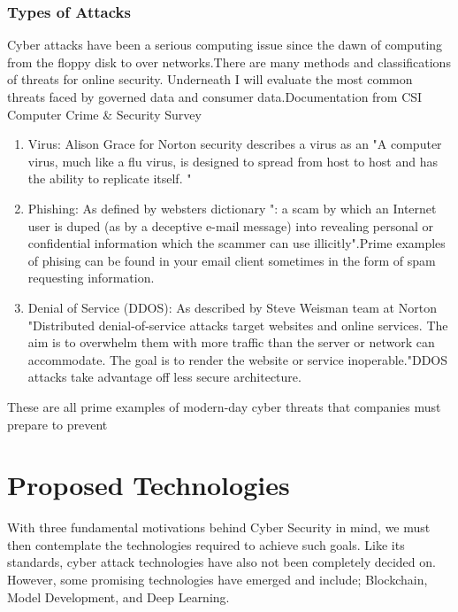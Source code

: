 \documentclass[journal]{IEEEtran}
\begin{document}
\subsubsection{Types of Attacks }
Cyber attacks have been a serious computing issue since the dawn of computing from the floppy disk to over networks.There are many methods and classifications of threats for online security. Underneath I will evaluate the most common threats faced by governed data and consumer data.Documentation from CSI Computer Crime & Security Survey \cite{csiSurvey}


\begin{enumerate}
  \item     Virus: Alison Grace for Norton security \cite{nortonVirus}  describes a virus as an "A computer virus, much like a flu virus, is designed to spread from host to host and has the ability to replicate itself. "
    \item    Phishing: As defined by websters dictionary ": a scam by which an Internet user is duped (as by a deceptive e-mail message) into revealing personal or confidential information which the scammer can use illicitly".Prime examples of phising can be found in your email client sometimes in the form of spam requesting information.

  \item     Denial of Service (DDOS): As described by Steve Weisman team at Norton \cite{nortonSecurity} "Distributed denial-of-service attacks target websites and online services. The aim is to overwhelm them with more traffic than the server or network can accommodate. The goal is to render the website or service inoperable."DDOS attacks take advantage off less secure architecture.
  
  


\end{enumerate}

These are all prime examples of modern-day cyber threats that companies must prepare to prevent

\section{Proposed Technologies}

With three fundamental motivations behind Cyber Security in mind, we must then contemplate the technologies required to achieve such goals. Like its standards, cyber attack technologies have also not been completely decided on. However, some promising technologies have emerged and include; Blockchain, Model Development, and Deep Learning.
\end{document}

